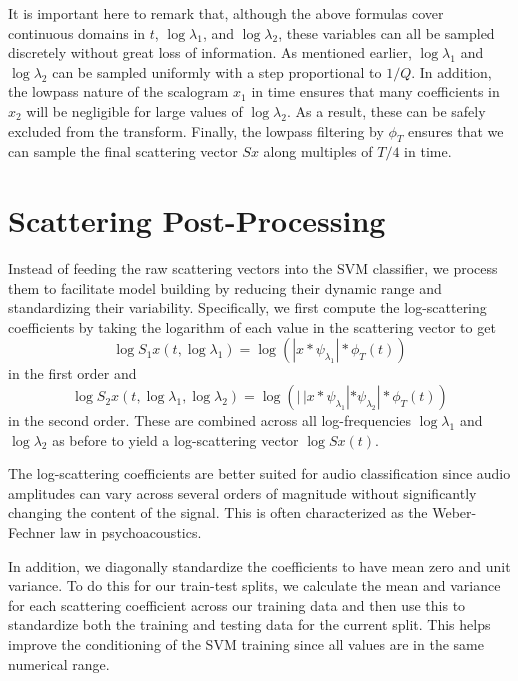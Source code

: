 \documentclass{article}
\newcommand{\lau}{{\lambda_1}}
\newcommand{\lad}{{\lambda_2}}
\begin{document}
\begin{sloppy}
It is important here to remark that, although the above formulas cover continuous domains in $t$, $\log \lau$, and $\log \lad$, these variables can all be sampled discretely without great loss of information. As mentioned earlier, $\log \lau$ and $\log \lad$ can be sampled uniformly with a step proportional to $1/Q$. In addition, the lowpass nature of the scalogram $x_1$ in time ensures that many coefficients in $x_2$ will be negligible for large values of $\log \lad$. As a result, these can be safely excluded from the transform. Finally, the lowpass filtering by $\phi_T$ ensures that we can sample the final scattering vector $Sx$ along multiples of $T/4$ in time.

\section{Scattering Post-Processing}
\label{sec:post}

Instead of feeding the raw scattering vectors into the SVM classifier, we process them to facilitate model building by reducing their dynamic range and standardizing their variability. Specifically, we first compute the log-scattering coefficients by taking the logarithm of each value in the scattering vector to get
\begin{equation}
	\log S_1 x(t, \log \lau) = \log \left( | x \ast \psi_\lau | \ast \phi_T(t) \right)
\end{equation}
in the first order and
\begin{equation}
	\log S_2 x(t, \log \lau, \log \lad) = \log \left( |\,| x \ast \psi_\lau | \ast \psi_\lad | \ast \phi_T(t) \right)
\end{equation}
in the second order. These are combined across all log-frequencies $\log \lau$ and $\log \lad$ as before to yield a log-scattering vector $\log Sx(t)$.

The log-scattering coefficients are better suited for audio classification since audio amplitudes can vary across several orders of magnitude without significantly changing the content of the signal. This is often characterized as the Weber-Fechner law in psychoacoustics.

In addition, we diagonally standardize the coefficients to have mean zero and unit variance. To do this for our train-test splits, we calculate the mean and variance for each scattering coefficient across our training data and then use this to standardize both the training and testing data for the current split. This helps improve the conditioning of the SVM training since all values are in the same numerical range.


\end{sloppy}
\end{document}
